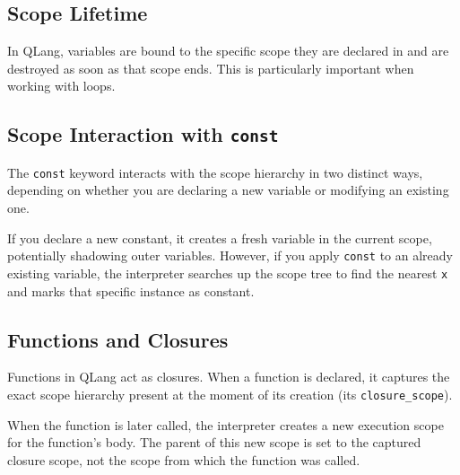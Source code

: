 \subsection{Scope Lifetime}
\label{sec:scope-lifetime}

In QLang, variables are bound to the specific scope they are declared in and are
destroyed as soon as that scope ends. This is particularly
important when working with loops.



\subsection{Scope Interaction with \texttt{const}}
\label{sec:const-scope}

The \texttt{const} keyword interacts with the scope hierarchy in two distinct
ways, depending on whether you are declaring a new variable or modifying an
existing one.

If you declare a new constant, it creates a fresh
variable in the current scope, potentially shadowing outer variables. 
However, if you apply \texttt{const} to an already existing variable, 
the interpreter searches up the scope tree to find the
nearest \texttt{x} and marks that specific instance as constant.


\subsection{Functions and Closures}
\label{sec:function-closures}

Functions in QLang act as closures. When a function is declared, it captures
the exact scope hierarchy present at the moment of its creation (its
\texttt{closure\_scope}). 

When the function is later called, the interpreter creates a new execution scope
for the function's body. The parent of this new scope is set to the captured
closure scope, not the scope from which the function was called.
